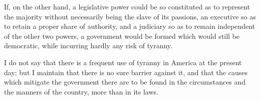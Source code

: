 If, on the other hand, a legislative power could be so
constituted as to represent the majority without necessarily being the
slave of its passions, an executive so as to retain a proper share of
authority, and a judiciary so as to remain independent of the other
two powers, a government  would be formed which would still
be democratic, while incurring hardly any risk of tyranny.

I do not say that there is a frequent use of tyranny in America at the
present day; but I maintain that there is no sure barrier against it,
and that the causes which mitigate the government there are to be
found in the circumstances and the manners of the country, more than
in its laws.
\nowidow %

